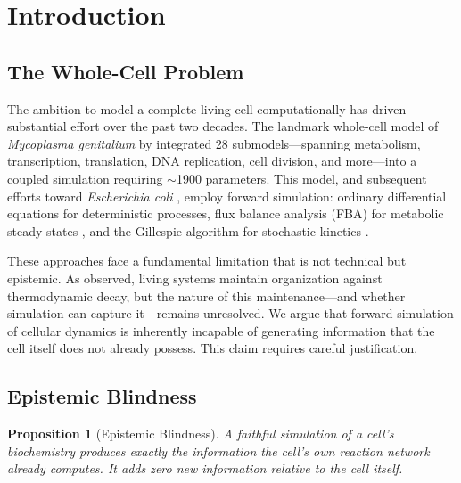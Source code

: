 \documentclass[twocolumn,10pt,a4paper]{article}
\newtheorem{proposition}[theorem]{Proposition}
\theoremstyle{definition}
\theoremstyle{remark}
\begin{document}
\section{Introduction}
\label{sec:introduction}

\subsection{The Whole-Cell Problem}

The ambition to model a complete living cell computationally has driven substantial effort over the past two decades. The landmark whole-cell model of \emph{Mycoplasma genitalium} by \citet{Karr2012} integrated 28 submodels---spanning metabolism, transcription, translation, DNA replication, cell division, and more---into a coupled simulation requiring $\sim$1900 parameters. This model, and subsequent efforts toward \emph{Escherichia coli} \citep{Palsson2006}, employ forward simulation: ordinary differential equations for deterministic processes, flux balance analysis (FBA) for metabolic steady states \citep{Orth2010}, and the Gillespie algorithm for stochastic kinetics \citep{Gillespie1977}.

These approaches face a fundamental limitation that is not technical but epistemic. As \citet{Schrodinger1944} observed, living systems maintain organization against thermodynamic decay, but the nature of this maintenance---and whether simulation can capture it---remains unresolved. We argue that forward simulation of cellular dynamics is inherently incapable of generating information that the cell itself does not already possess. This claim requires careful justification.

\subsection{Epistemic Blindness}

\begin{proposition}[Epistemic Blindness]
\label{prop:blindness}
A faithful simulation of a cell's biochemistry produces exactly the information the cell's own reaction network already computes. It adds zero new information relative to the cell itself.
\end{proposition}
\end{document}
